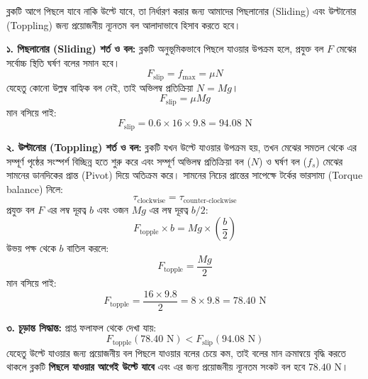 \documentclass[12pt, a4paper]{article}
\begin{document}
\begin{tcolorbox}[solutionbox={সমাধান (Solution)}]
\noindent
ব্লকটি আগে পিছলে যাবে নাকি উল্টে যাবে, তা নির্ধারণ করার জন্য আমাদের পিছলানোর (Sliding) এবং উল্টানোর (Toppling) জন্য প্রয়োজনীয় ন্যূনতম বল আলাদাভাবে হিসাব করতে হবে।

\vspace{0.5em}
\textbf{১. পিছলানোর (Sliding) শর্ত ও বল:}
ব্লকটি অনুভূমিকভাবে পিছলে যাওয়ার উপক্রম হলে, প্রযুক্ত বল $F$ মেঝের সর্বোচ্চ স্থিতি ঘর্ষণ বলের সমান হবে।
$$F_{\text{slip}} = f_{\max} = \mu N$$
যেহেতু কোনো উল্লম্ব বাহ্যিক বল নেই, তাই অভিলম্ব প্রতিক্রিয়া $N = Mg$।
$$F_{\text{slip}} = \mu M g$$
মান বসিয়ে পাই:
$$F_{\text{slip}} = 0.6 \times 16 \times 9.8 = 94.08\text{ N}$$

\vspace{0.5em}
\textbf{২. উল্টানোর (Toppling) শর্ত ও বল:}
ব্লকটি যখন উল্টে যাওয়ার উপক্রম হয়, তখন মেঝের সমতল থেকে এর সম্পূর্ণ পৃষ্ঠের সংস্পর্শ বিচ্ছিন্ন হতে শুরু করে এবং সম্পূর্ণ অভিলম্ব প্রতিক্রিয়া বল ($N$) ও ঘর্ষণ বল ($f_s$) মেঝের সামনের ডানদিকের প্রান্ত (Pivot) দিয়ে অতিক্রম করে। 
সামনের নিচের প্রান্তের সাপেক্ষে টর্কের ভারসাম্য (Torque balance) নিলে:
$$\tau_{\text{clockwise}} = \tau_{\text{counter-clockwise}}$$
প্রযুক্ত বল $F$ এর লম্ব দূরত্ব $b$ এবং ওজন $Mg$ এর লম্ব দূরত্ব $b/2$:
$$F_{\text{topple}} \times b = M g \times \left(\frac{b}{2}\right)$$
উভয় পক্ষ থেকে $b$ বাতিল করলে:
$$F_{\text{topple}} = \frac{Mg}{2}$$
মান বসিয়ে পাই:
$$F_{\text{topple}} = \frac{16 \times 9.8}{2} = 8 \times 9.8 = 78.40\text{ N}$$

\vspace{0.5em}
\textbf{৩. চূড়ান্ত সিদ্ধান্ত:}
প্রাপ্ত ফলাফল থেকে দেখা যায়:
$$F_{\text{topple}} (78.40\text{ N}) < F_{\text{slip}} (94.08\text{ N})$$
যেহেতু উল্টে যাওয়ার জন্য প্রয়োজনীয় বল পিছলে যাওয়ার বলের চেয়ে কম, তাই বলের মান ক্রমান্বয়ে বৃদ্ধি করতে থাকলে ব্লকটি \textbf{পিছলে যাওয়ার আগেই উল্টে যাবে} এবং এর জন্য প্রয়োজনীয় ন্যূনতম সংকট বল হবে $78.40\text{ N}$।
\end{tcolorbox}
\vspace{1em}
\end{document}
